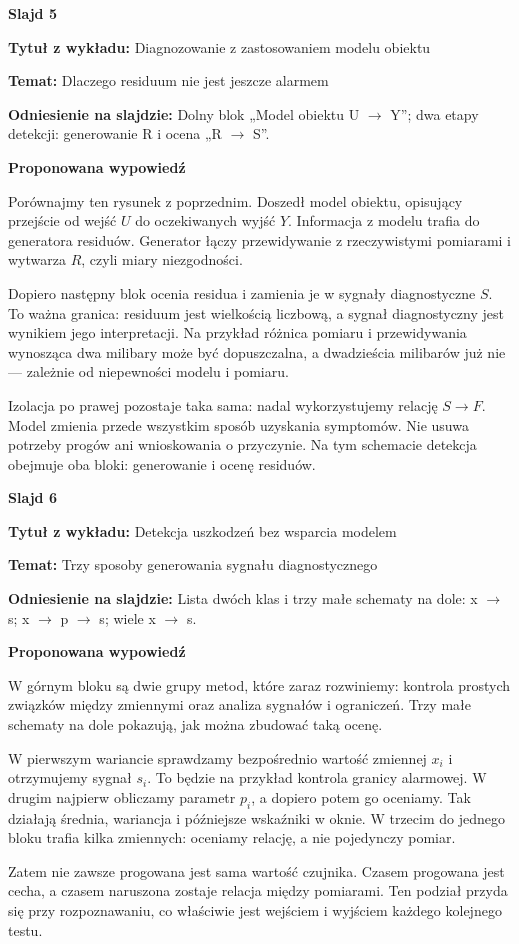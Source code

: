 \documentclass[a4paper,11pt]{article}
\newcommand{\NumerSlajdu}{1}
\newcommand{\Komentarz}[3]{%
  \gdef\NumerSlajdu{#1}%
  {\Large\bfseries Slajd #1\par}\smallskip
  \textbf{Tytuł z wykładu:} #2\par
  \textbf{Temat:} #3\par\medskip
}
\begin{document}
\Komentarz{5}{Diagnozowanie z zastosowaniem modelu obiektu}{Dlaczego residuum nie jest jeszcze alarmem}
{\small\color{black!65}\textbf{Odniesienie na slajdzie:} Dolny blok „Model obiektu U \ensuremath{\to} Y”; dwa etapy detekcji: generowanie R i ocena „R \ensuremath{\to} S”.\par}
\medskip
\textbf{Proponowana wypowiedź}\par
Porównajmy ten rysunek z poprzednim. Doszedł model obiektu, opisujący przejście od wejść $U$ do oczekiwanych wyjść $Y$. Informacja z modelu trafia do generatora residuów. Generator łączy przewidywanie z rzeczywistymi pomiarami i wytwarza $R$, czyli miary niezgodności.

Dopiero następny blok ocenia residua i zamienia je w sygnały diagnostyczne $S$. To ważna granica: residuum jest wielkością liczbową, a sygnał diagnostyczny jest wynikiem jego interpretacji. Na przykład różnica pomiaru i przewidywania wynosząca dwa milibary może być dopuszczalna, a dwadzieścia milibarów już nie — zależnie od niepewności modelu i pomiaru.

Izolacja po prawej pozostaje taka sama: nadal wykorzystujemy relację $S\to F$. Model zmienia przede wszystkim sposób uzyskania symptomów. Nie usuwa potrzeby progów ani wnioskowania o przyczynie. Na tym schemacie detekcja obejmuje oba bloki: generowanie i ocenę residuów.
\clearpage

\Komentarz{6}{Detekcja uszkodzeń bez wsparcia modelem}{Trzy sposoby generowania sygnału diagnostycznego}
{\small\color{black!65}\textbf{Odniesienie na slajdzie:} Lista dwóch klas i trzy małe schematy na dole: x \ensuremath{\to} s; x \ensuremath{\to} p \ensuremath{\to} s; wiele x \ensuremath{\to} s.\par}
\medskip
\textbf{Proponowana wypowiedź}\par
W górnym bloku są dwie grupy metod, które zaraz rozwiniemy: kontrola prostych związków między zmiennymi oraz analiza sygnałów i ograniczeń. Trzy małe schematy na dole pokazują, jak można zbudować taką ocenę.

W pierwszym wariancie sprawdzamy bezpośrednio wartość zmiennej $x_i$ i otrzymujemy sygnał $s_i$. To będzie na przykład kontrola granicy alarmowej. W drugim najpierw obliczamy parametr $p_i$, a dopiero potem go oceniamy. Tak działają średnia, wariancja i późniejsze wskaźniki w oknie. W trzecim do jednego bloku trafia kilka zmiennych: oceniamy relację, a nie pojedynczy pomiar.

Zatem nie zawsze progowana jest sama wartość czujnika. Czasem progowana jest cecha, a czasem naruszona zostaje relacja między pomiarami. Ten podział przyda się przy rozpoznawaniu, co właściwie jest wejściem i wyjściem każdego kolejnego testu.
\clearpage
\end{document}
